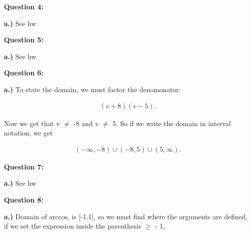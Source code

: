 \documentclass{report}
\begin{document}
    \bigbreak \noindent \bigbreak \noindent \bigbreak \noindent  
    \begin{Large}
        \textbf{Question 4:}
    \end{Large}

    \bigbreak \noindent 
    \textbf{a.)}
    \bigbreak \noindent 
    See hw

    \bigbreak \noindent \bigbreak \noindent \bigbreak \noindent  
    \begin{Large}
        \textbf{Question 5:}
    \end{Large}

    \bigbreak \noindent 
    \textbf{a.)}
    \bigbreak \noindent 
    See hw

    \bigbreak \noindent \bigbreak \noindent \bigbreak \noindent  
    \begin{Large}
        \textbf{Question 6:}
    \end{Large}

    \bigbreak \noindent 
    \textbf{a.)}
    \bigbreak \noindent 
    To state the domain, we must factor the denomonator;

    \begin{align*}
        \left(v+8\right) \left(v-5\right)
    .\end{align*}

    \bigbreak \noindent 
    Now we get that v $\neq$ -8 and v $\neq$ 5. So if we write the domain in interval notation, we get

    \begin{align*}
        \left(-\infty, -8\right) \cup \left(-8,5\right) \cup (5, \infty)
    .\end{align*}

    \bigbreak \noindent \bigbreak \noindent \bigbreak \noindent  
    \begin{Large}
        \textbf{Question 7:}
    \end{Large}

    \bigbreak \noindent 
    \textbf{a.)}
    \bigbreak \noindent 
    See hw


    \bigbreak \noindent \bigbreak \noindent \bigbreak \noindent  
    \begin{Large}
        \textbf{Question 8:}
    \end{Large}

    \bigbreak \noindent 
    \textbf{a.)}
    \bigbreak \noindent 
    Domain of arccos, is [-1,1], so we must find where the arguments are defined, 
    if we set the expression inside the parenthesis $\geq$ - 1, 
\end{document}
